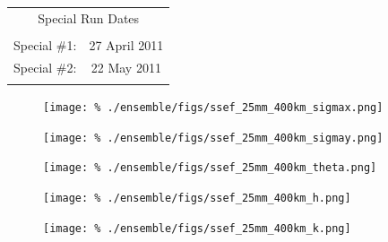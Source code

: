 \begin{table}[cc]
\begin{tabular}{||c c||}
        \multicolumn{2}{||c||}{\Large Special Run Dates} \\
        \vspace{\baselineskip} & \vspace{\baselineskip} \\
        Special \#1: & 27 April 2011 \\
        Special \#2: & 22 May 2011 \\
        \vspace{\baselineskip} & \vspace{\baselineskip} \\
        \hline \hline
    \end{tabular}
\end{table}





\clearpage
\begin{figure}[cc]
    \centering
    \texttt{[image: \%
    ./ensemble/figs/ssef\_25mm\_400km\_sigmax.png]}\\
    \caption{}
    \label{sigmax-25mm-400km-dist}
\end{figure}


\clearpage
\begin{figure}[cc]
    \centering
    \texttt{[image: \%
    ./ensemble/figs/ssef\_25mm\_400km\_sigmay.png]}\\
    \caption{}
    \label{sigmay-25mm-400km-dist}
\end{figure}


\clearpage
\begin{figure}[cc]
    \centering
    \texttt{[image: \%
    ./ensemble/figs/ssef\_25mm\_400km\_theta.png]}\\
    \caption{}
    \label{theta-25mm-400km-dist}
\end{figure}


\clearpage
\begin{figure}[cc]
    \centering
    \texttt{[image: \%
    ./ensemble/figs/ssef\_25mm\_400km\_h.png]}\\
    \caption{}
    \label{h-25mm-400km-dist}
\end{figure}


\clearpage
\begin{figure}[cc]
    \centering
    \texttt{[image: \%
    ./ensemble/figs/ssef\_25mm\_400km\_k.png]}\\
    \caption{}
    \label{k-25mm-400km-dist}
\end{figure}


